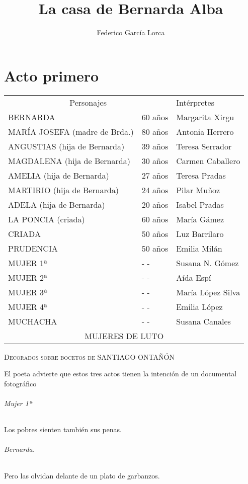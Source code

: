 \documentclass[12pt,twoside,openany,showtrims,a5paper]{memoir}
\author{Federico García Lorca}
\title{La casa de Bernarda Alba}
\begin{document}
\part{Acto primero}
\begin{table}[hbt!]
\setlength{\tabcolsep}{2pt} %
\begin{tabular}{l l l}
\multicolumn{2}{c}{Personajes} & Intérpretes \\ 
BERNARDA & 60 años & Margarita Xirgu \\ 
MARÍA JOSEFA (madre de Brda.) & 80 años & Antonia Herrero \\ 
ANGUSTIAS (hija de Bernarda) & 39 años & Teresa Serrador \\ 
MAGDALENA (hija de Bernarda) & 30 años & Carmen Caballero \\ 
AMELIA (hija de Bernarda) & 27 años & Teresa Pradas \\ 
MARTIRIO (hija de Bernarda) & 24 años & Pilar Muñoz \\ 
ADELA (hija de Bernarda) & 20 años & Isabel Pradas \\ 
LA PONCIA (criada) & 60 años & María Gámez \\ 
CRIADA & 50 años & Luz Barrilaro \\ 
PRUDENCIA & 50 años & Emilia Milán \\ 
MUJER 1ª & - - & Susana N. Gómez \\ 
MUJER 2ª & - - & Aída Espí \\ 
MUJER 3ª & - - & María López Silva \\ 
MUJER 4ª & - - & Emilia López \\ 
MUCHACHA & - - & Susana Canales \\ 
\multicolumn{3}{c}{MUJERES DE LUTO} \\ 
\end{tabular} 
\end{table}
\begin{center}
\scshape{Decorados sobre bocetos de SANTIAGO ONTAÑÓN}
\end{center}
\begin{center}
El poeta advierte que estos tres actos tienen la intención de un documental fotográfico
\end{center}

\paragraph{Mujer 1ª}
Los pobres sienten también sus penas.
\paragraph{Bernarda.}
Pero las olvidan delante de un plato de garbanzos.
\end{document}
